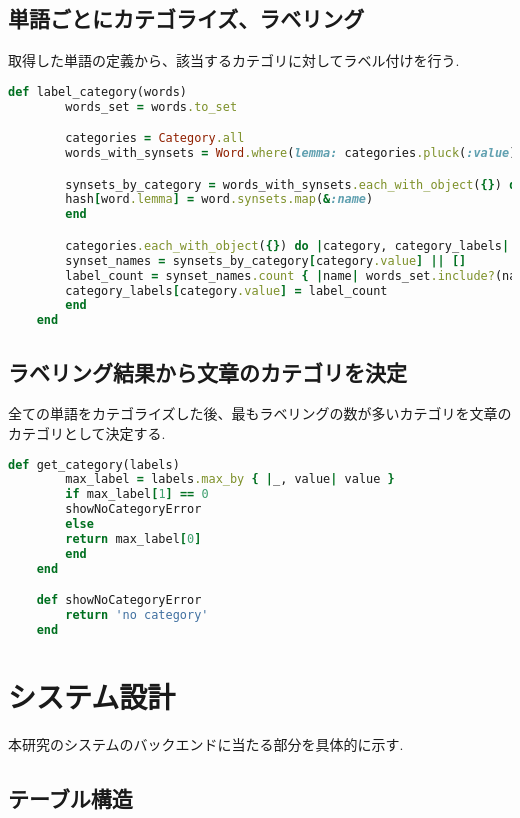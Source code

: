 \subsection{単語ごとにカテゴライズ、ラベリング}
\label{sebsec:app_categolize}

取得した単語の定義から、該当するカテゴリに対してラベル付けを行う.
\clearpage
\begin{lstlisting}[language=Ruby, caption=カテゴリのラベリングメソッド]
    def label_category(words)
        words_set = words.to_set

        categories = Category.all
        words_with_synsets = Word.where(lemma: categories.pluck(:value)).includes(:synsets)

        synsets_by_category = words_with_synsets.each_with_object({}) do |word, hash|
        hash[word.lemma] = word.synsets.map(&:name)
        end

        categories.each_with_object({}) do |category, category_labels|
        synset_names = synsets_by_category[category.value] || []
        label_count = synset_names.count { |name| words_set.include?(name) }
        category_labels[category.value] = label_count
        end
    end
\end{lstlisting}

\subsection{ラベリング結果から文章のカテゴリを決定}
\label{subsec:app_classify}

全ての単語をカテゴライズした後、最もラベリングの数が多いカテゴリを文章のカテゴリとして決定する.
\clearpage
\begin{lstlisting}[language=Ruby, caption=文書のカテゴリを決定するメソッド]
    def get_category(labels)
        max_label = labels.max_by { |_, value| value }
        if max_label[1] == 0
        showNoCategoryError
        else
        return max_label[0]
        end
    end

    def showNoCategoryError
        return 'no category'
    end
\end{lstlisting}
\section{システム設計}
\label{sec:app_design}
本研究のシステムのバックエンドに当たる部分を具体的に示す.
\subsection{テーブル構造}
\label{subsec:table}

